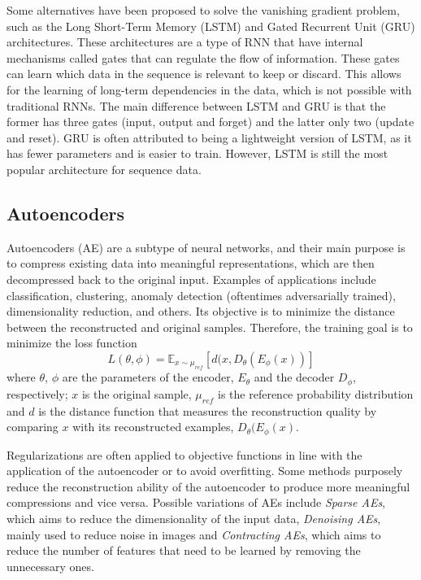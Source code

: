 Some alternatives have been proposed to solve the vanishing gradient problem, such as the Long Short-Term Memory (LSTM) and Gated Recurrent Unit (GRU) architectures. These architectures are a type of RNN that have internal mechanisms called gates that can regulate the flow of information. These gates can learn which data in the sequence is relevant to keep or discard. This allows for the learning of long-term dependencies in the data, which is not possible with traditional RNNs. The main difference between LSTM and GRU is that the former has three gates (input, output and forget) and the latter only two (update and reset). GRU is often attributed to being a lightweight version of LSTM, as it has fewer parameters and is easier to train. However, LSTM is still the most popular architecture for sequence data.\cite{Schmidt_RecurrentNeuralNetworks_2019}

\subsection{Autoencoders}
Autoencoders (AE) are a subtype of neural networks, and their main purpose is to compress existing data into meaningful representations, which are then decompressed back to the original input. Examples of applications include classification, clustering, anomaly detection (oftentimes adversarially trained), dimensionality reduction, and others. Its objective is to minimize the distance between the reconstructed and original samples. Therefore, the training goal is to minimize the loss function  
\begin{equation}
    L(\theta, \phi) = \mathbb{E}_{x\sim\mu_{ref}}[d(x, D_{\theta}(E_{\phi}(x))]
    \label{eq:ae_objective_func}
\end{equation} where $\theta$, $\phi$ are the parameters of the encoder, $E_\theta$ and the decoder $D_\phi$, respectively; $x$ is the original sample, $\mu_{ref}$ is the reference probability distribution and $d$ is the distance function that measures the reconstruction quality by comparing $x$ with its reconstructed examples, $D_{\theta}(E_{\phi}(x)$.

Regularizations are often applied to objective functions in line with the application of the autoencoder or to avoid overfitting. Some methods purposely reduce the reconstruction ability of the autoencoder to produce more meaningful compressions and vice versa. Possible variations of AEs include \textit{Sparse AEs}, which aims to reduce the dimensionality of the input data, \textit{Denoising AEs}, mainly used to reduce noise in images and \textit{Contracting AEs}, which aims to reduce the number of features that need to be learned by removing the unnecessary ones. %

